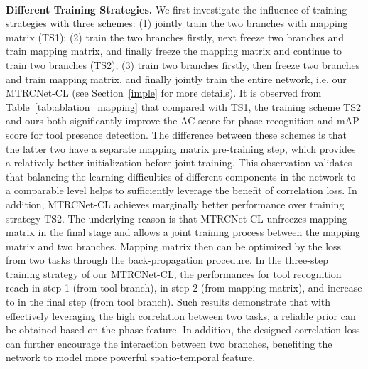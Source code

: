 \documentclass{elsarticle}
\begin{document}
\\
\textbf{Different Training Strategies.}
We first investigate the influence of training strategies with three schemes:
(1) jointly train the two branches with mapping matrix (TS1);
(2) train the two branches firstly, next freeze two branches and train mapping matrix, and finally freeze the mapping matrix and continue to train two branches (TS2);
(3) train two branches firstly, then freeze two branches and train mapping matrix, and finally jointly train the entire network, i.e. our MTRCNet-CL (see Section~\ref{imple} for more details).
It is observed from Table~\ref{tab:ablation_mapping} that
compared with TS1, the training scheme TS2 and ours both significantly improve the AC score for phase recognition and mAP score for tool presence detection.
The difference between these schemes is that the latter two have a separate mapping matrix pre-training step, 
which provides a relatively better initialization before joint training. 
This observation validates that balancing the learning difficulties of different components in the network to a comparable level
helps to sufficiently leverage the benefit of correlation loss.
In addition, MTRCNet-CL achieves marginally better performance over training strategy TS2.
The underlying reason is that MTRCNet-CL unfreezes mapping matrix in the final stage and allows a joint training process between the mapping matrix and two branches.
Mapping matrix then can be optimized by the loss from two tasks through the back-propagation procedure.
In the three-step training strategy of our MTRCNet-CL, the performances for tool recognition reach  in step-1 (from tool branch),  in step-2 (from mapping matrix), and increase to  in the final step (from tool branch).
Such results demonstrate that with effectively leveraging the high correlation between two tasks, a reliable prior can be obtained based on the phase feature.
In addition, the designed correlation loss can further encourage the interaction between two branches, benefiting the network to model more powerful spatio-temporal feature.
\end{document}
